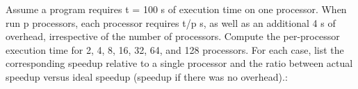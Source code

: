\documentclass{article}
\begin{document}
\begin{enumerate}
Assume a program requires t = 100 s of execution time on one processor. When run p processors, each processor requires t/p s, as well as an additional 4 s of overhead, irrespective of the number of processors. Compute the per-processor execution time for 2, 4, 8, 16, 32, 64, and 128 processors. For each case, list the corresponding speedup relative to a single processor and the ratio between actual speedup versus ideal speedup (speedup if there was no overhead).: 
\end{enumerate}
\end{document}
